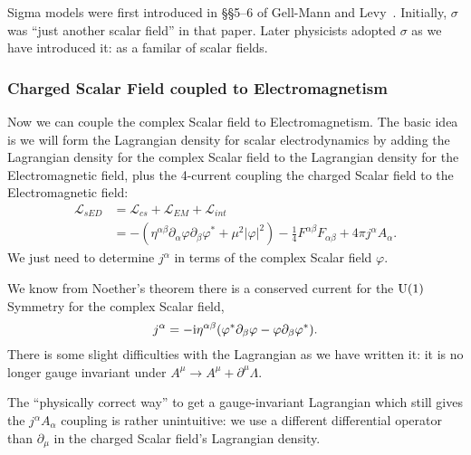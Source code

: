 \begin{remark}
Sigma models were first introduced in \S\S5--6 of Gell-Mann and Levy~\cite{Gell-Mann:1960mvl}.
Initially, $\sigma$ was ``just another scalar field'' in that paper. Later
physicists adopted $\sigma$ as we have introduced it: as a familar of
scalar fields.
\end{remark}

\subsubsection{Charged Scalar Field coupled to Electromagnetism}

\M
Now we can couple the complex Scalar field to Electromagnetism.
The basic idea is we will form the Lagrangian density for scalar
electrodynamics by adding the Lagrangian density for the complex Scalar
field to the Lagrangian density for the Electromagnetic field, plus the
4-current coupling the charged Scalar field to the Electromagnetic field:
\begin{equation}
\begin{split}
\mathcal{L}_{sED}&=\mathcal{L}_{cs}+\mathcal{L}_{EM}+\mathcal{L}_{int}\\
&=-(\eta^{\alpha\beta}\partial_{\alpha}\varphi\partial_{\beta}\varphi^{*}+\mu^{2}|\varphi|^{2})
-\frac{1}{4}F^{\alpha\beta}F_{\alpha\beta}
+4\pi j^{\alpha}A_{\alpha}.
\end{split}
\end{equation}
We just need to determine $j^{\alpha}$ in terms of the complex Scalar
field $\varphi$.

We know from Noether's theorem there is a conserved current for the
$\operatorname{U}(1)$ Symmetry for the complex Scalar field,
\begin{equation}
j^{\alpha} = -\mathrm{i}\eta^{\alpha\beta}(\varphi^{*}\partial_{\beta}\varphi - \varphi\partial_{\beta}\varphi^{*}).
\end{equation}
There is some slight difficulties with the Lagrangian as we have written
it: it is no longer gauge invariant under $A^{\mu}\to
A^{\mu}+\partial^{\mu}\Lambda$.

The ``physically correct way'' to get a gauge-invariant Lagrangian which
still gives the $j^{\alpha}A_{\alpha}$ coupling is rather unintuitive:
we use a different differential operator than $\partial_{\mu}$ in the
charged Scalar field's Lagrangian density.

